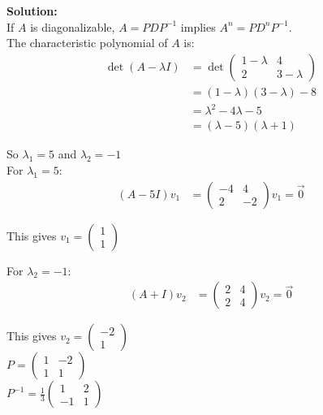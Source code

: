 \documentclass{article}
\begin{document}
\textbf{Solution:} \\

If $A$ is diagonalizable, $A = PDP^{-1}$ implies $A^n = PD^nP^{-1}$. \\

The characteristic polynomial of $A$ is:
\begin{align*}
\det(A - \lambda I) &= \det\begin{pmatrix} 1-\lambda & 4 \\ 2 & 3-\lambda \end{pmatrix} \\
&= (1-\lambda)(3-\lambda) - 8 \\
&= \lambda^2 - 4\lambda - 5 \\
&= (\lambda - 5)(\lambda + 1)
\end{align*}

So $\lambda_1 = 5$ and $\lambda_2 = -1$ \\

For $\lambda_1 = 5$:
\begin{align*}
(A - 5I)v_1 &= \begin{pmatrix} -4 & 4 \\ 2 & -2 \end{pmatrix}v_1 = \vec{0}
\end{align*}

This gives $v_1 = \begin{pmatrix} 1 \\ 1 \end{pmatrix}$

For $\lambda_2 = -1$:
\begin{align*}
(A + I)v_2 &= \begin{pmatrix} 2 & 4 \\ 2 & 4 \end{pmatrix}v_2 = \vec{0}
\end{align*}

This gives $v_2 = \begin{pmatrix} -2 \\ 1 \end{pmatrix}$ \\

$P = \begin{pmatrix} 1 & -2 \\ 1 & 1 \end{pmatrix}$ \\

$P^{-1} = \frac{1}{3}\begin{pmatrix} 1 & 2 \\ -1 & 1 \end{pmatrix}$ \\
\end{document}
